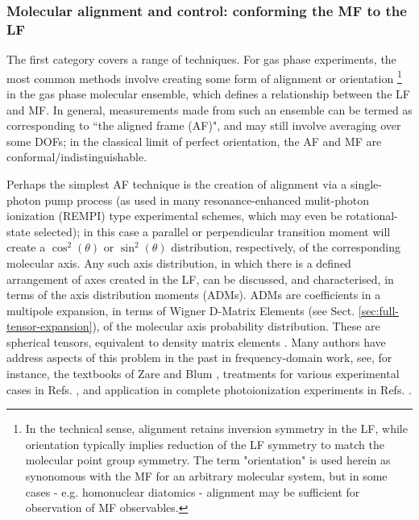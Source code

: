 \documentclass[10pt]{article}
\begin{document}
\subsubsection{Molecular alignment and control: conforming the MF to the LF\label{sec:MF-control}}

The first category covers a range of techniques. For gas phase experiments, the most common methods involve creating some form of alignment or orientation \footnote{In the technical sense, alignment retains 
inversion symmetry in the LF, while orientation typically implies reduction of the LF symmetry to match the molecular point group symmetry. The term "orientation" is used herein as synonomous with the MF for an arbitrary molecular system, but in some cases - e.g. homonuclear diatomics - alignment may be sufficient for observation of MF observables.} 
in the gas phase molecular ensemble, which defines a relationship between the LF and MF. In general, measurements made from such an ensemble can be termed as corresponding to ``the aligned frame (AF)", and may still involve averaging over some DOFs; in the 
classical limit of perfect orientation, the AF and MF are conformal/indistinguishable. 

Perhaps the simplest AF technique is the creation of alignment via a single-photon pump process (as used in many resonance-enhanced mulit-photon ionization (REMPI) type experimental schemes, which may even be rotational-state selected); in this case a parallel or perpendicular transition moment will create a $\cos^2(\theta)$ or $\sin^2(\theta)$ distribution, respectively, of the corresponding molecular axis. Any such axis distribution, in which there is a defined arrangement of axes created in the LF, can be discussed, and characterised, in terms of the axis distribution moments (ADMs). ADMs are coefficients in a multipole expansion, in terms of Wigner D-Matrix Elements (see Sect. \ref{sec:full-tensor-expansion}), of the molecular axis probability distribution. These are spherical tensors, equivalent to density matrix elements \cite{BlumDensityMat}. Many authors have address aspects of this problem in the past in frequency-domain work, see, for instance, the textbooks of Zare \cite{zareAngMom} and Blum \cite{BlumDensityMat}, treatments for various experimental cases in Refs. \cite{Docker1988,Dubs1989,Greene1983}, and application in complete photoionization experiments in Refs. \cite{Leahy1991,hockett2009RotationallyResolvedPhotoelectron}.
\end{document}
